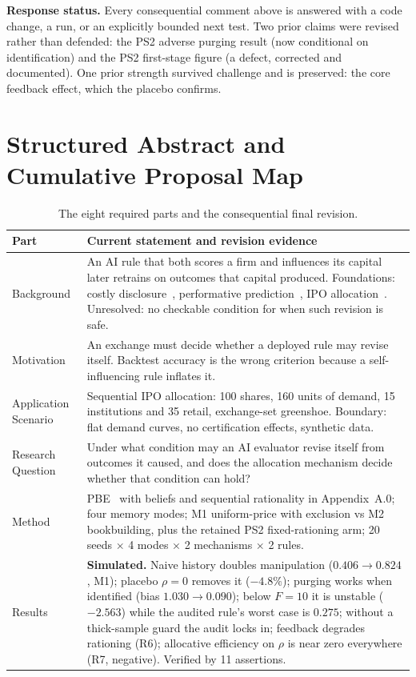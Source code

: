 \smallskip\noindent\textbf{Response status.} Every consequential comment above is answered with a code change, a run, or an explicitly bounded next test. Two prior claims were revised rather than defended: the PS2 adverse purging result (now conditional on identification) and the PS2 first-stage figure (a defect, corrected and documented). One prior strength survived challenge and is preserved: the core feedback effect, which the placebo confirms.

\clearpage\nobalance\onecolumn
\section{Structured Abstract and Cumulative Proposal Map}
\begin{table}[H]\caption{The eight required parts and the consequential final revision.}
\renewcommand{\arraystretch}{1.10}
\begin{tabularx}{\textwidth}{@{}p{}Y@{}}\toprule
\textbf{Part}&\textbf{Current statement and revision evidence}\\\midrule
Background & An AI rule that both scores a firm and influences its capital later retrains on outcomes that capital produced. Foundations: costly disclosure~\cite{lacker1989,crocker2007,cao2023machine}, performative prediction~\cite{perdomo2020}, IPO allocation~\cite{benveniste1989,sherman2005}. Unresolved: no checkable condition for when such revision is safe.\\
Motivation & An exchange must decide whether a deployed rule may revise itself. Backtest accuracy is the wrong criterion because a self-influencing rule inflates it.\\
Application Scenario & Sequential IPO allocation: 100 shares, 160 units of demand, 15 institutions and 35 retail, exchange-set greenshoe. Boundary: flat demand curves, no certification effects, synthetic data.\\
Research Question & Under what condition may an AI evaluator revise itself from outcomes it caused, and does the allocation mechanism decide whether that condition can hold?\\
Method & PBE~\cite{harsanyi1968,fudenberg1991} with beliefs and sequential rationality in Appendix~A.0; four memory modes; M1 uniform-price with exclusion vs M2 bookbuilding, plus the retained PS2 fixed-rationing arm; 20 seeds $\times$ 4 modes $\times$ 2 mechanisms $\times$ 2 rules.\\
Results & \textbf{Simulated.} Naive history doubles manipulation ($0.406\to0.824$, M1); placebo $\rho=0$ removes it ($-4.8\%$); purging works when identified (bias $1.030\to0.090$); below $F=10$ it is unstable ($-2.563$) while the audited rule's worst case is $0.275$; without a thick-sample guard the audit locks in; feedback degrades rationing (R6); allocative efficiency on $\rho$ is near zero everywhere (R7, negative). Verified by 11 assertions.\\

\end{tabularx}
\end{table}
